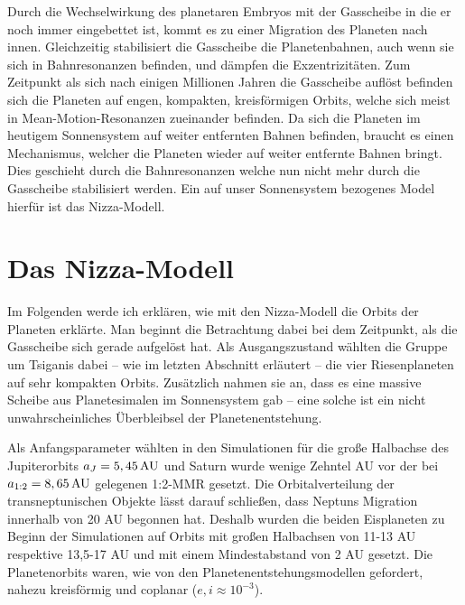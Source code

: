 \documentclass[12pt,a4paper,twoside]{article}
\renewcommand{\cite}{\citep}
\begin{document}
Durch die Wechselwirkung des planetaren Embryos mit der Gasscheibe in die er noch immer eingebettet ist, kommt es zu einer Migration des Planeten nach innen. Gleichzeitig stabilisiert die Gasscheibe die Planetenbahnen, auch wenn sie sich in Bahnresonanzen befinden, und dämpfen die Exzentrizitäten. Zum Zeitpunkt als sich nach einigen Millionen Jahren die Gasscheibe auflöst befinden sich die Planeten auf engen, kompakten, kreisförmigen Orbits, welche sich meist in Mean-Motion-Resonanzen zueinander befinden\cite{Nesvorny2011}.
Da sich die Planeten im heutigem Sonnensystem auf weiter entfernten Bahnen befinden, braucht es einen Mechanismus, welcher die Planeten wieder auf weiter entfernte Bahnen bringt. Dies geschieht durch die Bahnresonanzen welche nun nicht mehr durch die Gasscheibe stabilisiert werden. Ein auf unser Sonnensystem bezogenes Model hierfür ist das Nizza-Modell.

\section{Das Nizza-Modell}\label{Orbits}
Im Folgenden werde ich erklären, wie \cite{Tsiganis2005} mit den Nizza-Modell die Orbits der Planeten erklärte.
Man beginnt die Betrachtung dabei bei dem Zeitpunkt, als die Gasscheibe sich gerade aufgelöst hat.
Als Ausgangszustand wählten die Gruppe um Tsiganis dabei – wie im letzten Abschnitt erläutert – die vier Riesenplaneten auf sehr kompakten Orbits. Zusätzlich nahmen sie an, dass es eine massive Scheibe aus Planetesimalen im Sonnensystem gab -- eine solche ist ein nicht unwahrscheinliches Überbleibsel der Planetenentstehung.

Als Anfangsparameter wählten \cite{Tsiganis2005} in den Simulationen für die große Halbachse des Jupiterorbits $a_J = \unit[5,45]{AU}$ und Saturn wurde wenige Zehntel AU vor der bei $a_{1:2} = \unit[8,65]{AU}$ gelegenen 1:2-MMR gesetzt.
Die Orbitalverteilung der transneptunischen Objekte lässt darauf schließen, dass Neptuns Migration innerhalb von 20 AU begonnen hat\cite{Tsiganis2005}.
Deshalb wurden die beiden Eisplaneten zu Beginn der Simulationen auf Orbits mit großen Halbachsen von 11-13 AU respektive 13,5-17 AU und mit einem Mindestabstand von 2 AU gesetzt.
Die Planetenorbits waren, wie von den Planetenentstehungsmodellen gefordert, nahezu kreisförmig und coplanar ($e, i \approx 10^{-3}$).
\end{document}
